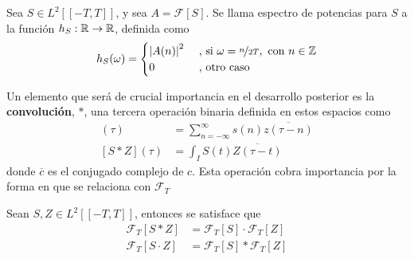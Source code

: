 \begin{definicion}
Sea $S \in L^{2}\left[[-T,T]\right]$, y sea $A = \mathcal{F}[S]$. Se llama espectro de potencias 
para $S$ a la función $h_S : \mathbb{R} \rightarrow \mathbb{R} $, definida como
\begin{equation*}
h_S(\omega) = 
\begin{cases}
\left| A(n) \right|^{2} & \text{ , si } \omega = \nicefrac{n}{2T}, \text{   con } n\in \mathbb{Z} \\
0 & \text{ ,  otro caso}
\end{cases}
\end{equation*}
\label{espec}
\end{definicion}

Un elemento que será de crucial importancia en el desarrollo posterior es la \textbf{convolución}, 
$\ast$, una tercera operación binaria definida en estos espacios como
%
\begin{align*}
[s \ast z] (\tau) &= \sum_{n=-\infty}^{\infty} s(n) \overline{z(\tau-n)} \\
[S \ast Z] (\tau) &= \int_I S(t) \overline{Z(\tau-t)}
\end{align*}
%
donde $\overline{c}$ es el conjugado complejo de $c$. 
Esta operación cobra importancia por la forma en que se relaciona con $\mathcal{F}_T$
%
\begin{teorema}%
Sean $S,Z \in L^{2}\left[[-T,T]\right]$, entonces se satisface que
\begin{align*}
\mathcal{F}_T[S\ast Z]  &= \mathcal{F}_T[S] \cdot \mathcal{F}_T[Z] \\
\mathcal{F}_T[S\cdot Z] &= \mathcal{F}_T[S] \ast  \mathcal{F}_T[Z] 
\end{align*}
\label{t_convolucion}
\end{teorema}

%
%


